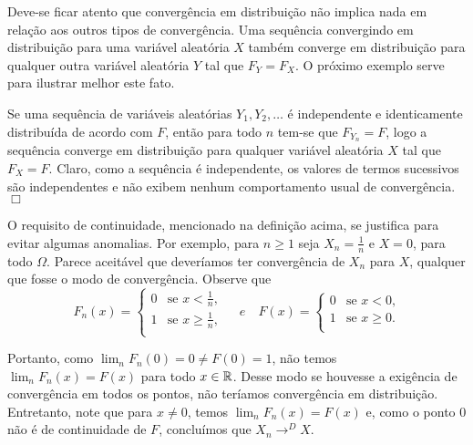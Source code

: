 %
\begin{frame}
%
%
Deve-se ficar atento que convergência em distribuição não implica
nada em relação aos outros tipos de convergência. Uma sequência
convergindo em distribuição para uma variável aleatória $X$ também
converge em distribuição para qualquer outra variável aleatória $Y$
tal que $F_Y=F_X$. O próximo exemplo serve para ilustrar melhor este
fato.
%
%
%
%
\begin{exem}
Se uma sequência de variáveis aleatórias $Y_1,Y_2,\ldots$ é
independente e identicamente distribuída de acordo com $F$, então
para todo $n$ tem-se que $F_{Y_n}=F$, logo a sequência converge em
distribuição para qualquer variável aleatória $X$ tal que $F_X=F$.
Claro, como a sequência é independente, os valores de termos
sucessivos são independentes e não exibem nenhum comportamento usual
de convergência. $\Box$
\end{exem}
%
%
%
%
%
O requisito de continuidade, mencionado na definição acima, se
justifica para evitar algumas anomalias. Por exemplo, para $n\geq 1$
seja $X_n=\frac{1}{n}$ e $X=0$, para todo $\Omega$. Parece aceitável
que deveríamos ter convergência de $X_n$ para $X$, qualquer que
fosse o modo de convergência. Observe que
\[
F_{n}(x)= \left\{
\begin{array}{ll}
0 & \mbox{se $x<\frac{1}{n}$,} \\
1 & \mbox{se $x\geq \frac{1}{n}$, } \\
\end{array}
\right.
\quad e \quad F(x)= \left\{
\begin{array}{ll}
0 & \mbox{se $x<0$,} \\
1 & \mbox{se $x\geq 0$.} \\
\end{array}
\right.
\]

%
%
%
Portanto, como $\lim_n F_n(0)=0\ne F(0)=1$, não temos
$\lim_{n}F_n(x)=F(x)$ para todo $x\in\mathbb{R}$. Desse modo se houvesse a
exigência de convergência em todos os pontos, não teríamos
convergência em distribuição. Entretanto, note que para $x\ne 0$,
temos $\lim_n F_n(x)=F(x)$ e, como o ponto 0 não é de continuidade
de $F$, concluímos que $X_n\rightarrow^D X$.
\end{frame}
